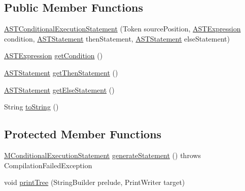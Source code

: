 \subsection*{Public Member Functions}
\begin{DoxyCompactItemize}
\item 
\hyperlink{classorg_1_1tzi_1_1use_1_1parser_1_1soil_1_1ast_1_1_a_s_t_conditional_execution_statement_a548eb6c93da0f275859a109ebf39a82b}{A\-S\-T\-Conditional\-Execution\-Statement} (Token source\-Position, \hyperlink{classorg_1_1tzi_1_1use_1_1parser_1_1ocl_1_1_a_s_t_expression}{A\-S\-T\-Expression} condition, \hyperlink{classorg_1_1tzi_1_1use_1_1parser_1_1soil_1_1ast_1_1_a_s_t_statement}{A\-S\-T\-Statement} then\-Statement, \hyperlink{classorg_1_1tzi_1_1use_1_1parser_1_1soil_1_1ast_1_1_a_s_t_statement}{A\-S\-T\-Statement} else\-Statement)
\item 
\hyperlink{classorg_1_1tzi_1_1use_1_1parser_1_1ocl_1_1_a_s_t_expression}{A\-S\-T\-Expression} \hyperlink{classorg_1_1tzi_1_1use_1_1parser_1_1soil_1_1ast_1_1_a_s_t_conditional_execution_statement_a0eb5bab2035b4170c06650f57f8e990d}{get\-Condition} ()
\item 
\hyperlink{classorg_1_1tzi_1_1use_1_1parser_1_1soil_1_1ast_1_1_a_s_t_statement}{A\-S\-T\-Statement} \hyperlink{classorg_1_1tzi_1_1use_1_1parser_1_1soil_1_1ast_1_1_a_s_t_conditional_execution_statement_ace4b8aa58756085f7187643c982bd2a8}{get\-Then\-Statement} ()
\item 
\hyperlink{classorg_1_1tzi_1_1use_1_1parser_1_1soil_1_1ast_1_1_a_s_t_statement}{A\-S\-T\-Statement} \hyperlink{classorg_1_1tzi_1_1use_1_1parser_1_1soil_1_1ast_1_1_a_s_t_conditional_execution_statement_a92ad3b6796ea5ee250bf09e008903677}{get\-Else\-Statement} ()
\item 
String \hyperlink{classorg_1_1tzi_1_1use_1_1parser_1_1soil_1_1ast_1_1_a_s_t_conditional_execution_statement_a68a45094d11ce5b06fd1e41ddbe60740}{to\-String} ()
\end{DoxyCompactItemize}
\subsection*{Protected Member Functions}
\begin{DoxyCompactItemize}
\item 
\hyperlink{classorg_1_1tzi_1_1use_1_1uml_1_1sys_1_1soil_1_1_m_conditional_execution_statement}{M\-Conditional\-Execution\-Statement} \hyperlink{classorg_1_1tzi_1_1use_1_1parser_1_1soil_1_1ast_1_1_a_s_t_conditional_execution_statement_aa78b9eb6ff5df886c5d5f8ca3f77ce4b}{generate\-Statement} ()  throws Compilation\-Failed\-Exception 
\item 
void \hyperlink{classorg_1_1tzi_1_1use_1_1parser_1_1soil_1_1ast_1_1_a_s_t_conditional_execution_statement_ae8cc182f25b6bb98f0fa4d4843b5c93b}{print\-Tree} (String\-Builder prelude, Print\-Writer target)
\end{DoxyCompactItemize}
